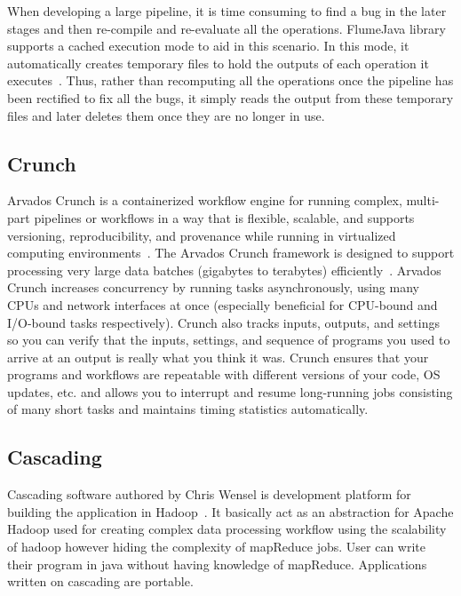When developing a large pipeline, it is time consuming to find a bug
in the later stages and then re-compile and re-evaluate all the
operations. FlumeJava library supports a cached execution mode to aid
in this scenario. In this mode, it automatically creates temporary
files to hold the outputs of each operation it
executes~\cite{flumejava-paper}. Thus, rather than recomputing all the
operations once the pipeline has been rectified to fix all the bugs,
it simply reads the output from these temporary files and later
deletes them once they are no longer in use.

\pv

\subsection{Crunch}

Arvados Crunch is a containerized workflow engine for running complex,
multi-part pipelines or workflows in a way that is flexible, scalable,
and supports versioning, reproducibility, and provenance while running
in virtualized computing environments~\cite{www-arvados}. The Arvados
Crunch framework is designed to support processing very large data
batches (gigabytes to terabytes)
efficiently~\cite{www-crunch}. Arvados Crunch increases concurrency by
running tasks asynchronously, using many CPUs and network interfaces
at once (especially beneficial for CPU-bound and I/O-bound tasks
respectively). Crunch also tracks inputs, outputs, and settings so you
can verify that the inputs, settings, and sequence of programs you
used to arrive at an output is really what you think it was. Crunch
ensures that your programs and workflows are repeatable with different
versions of your code, OS updates, etc. and allows you to interrupt
and resume long-running jobs consisting of many short tasks and
maintains timing statistics automatically.

    \pv

\subsection{Cascading}

Cascading software authored by Chris Wensel is development platform
for building the application in Hadoop~\cite{www-cascading}.  It
basically act as an abstraction for Apache Hadoop used for creating
complex data processing workflow using the scalability of hadoop
however hiding the complexity of mapReduce jobs.  User can write their
program in java without having knowledge of mapReduce. Applications
written on cascading are portable.
 
